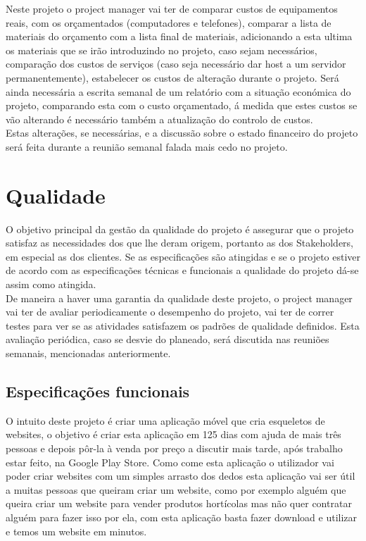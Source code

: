 \documentclass[a4paper]{article}
\begin{document}
Neste projeto o project manager vai ter de comparar custos de equipamentos reais, com os orçamentados (computadores e telefones), comparar a lista de materiais do orçamento com a lista final de materiais, adicionando a esta ultima os materiais que se irão introduzindo no projeto, caso sejam necessários, comparação dos custos de serviços (caso seja necessário dar host a um servidor permanentemente), estabelecer os custos de alteração durante o projeto. Será ainda necessária a escrita semanal de um relatório com a situação económica do projeto, comparando esta com o custo orçamentado, á medida que estes custos se vão alterando é necessário também a atualização do controlo de custos.\\
Estas alterações, se necessárias, e a discussão sobre o estado financeiro do projeto será feita durante a reunião semanal falada mais cedo no projeto.

\newpage

\section{Qualidade}

O objetivo principal da gestão da qualidade do projeto é assegurar que o projeto satisfaz as necessidades dos que lhe deram origem, portanto as dos Stakeholders, em especial as dos clientes. Se as especificações são atingidas e se o projeto estiver de acordo com as especificações técnicas e funcionais a qualidade do projeto dá-se assim como atingida. \\
De maneira a haver uma garantia da qualidade deste projeto, o project manager vai ter de avaliar periodicamente o desempenho do projeto, vai ter de correr testes para ver se as atividades satisfazem os padrões de qualidade definidos. Esta avaliação periódica, caso se desvie do planeado, será discutida nas reuniões semanais, mencionadas anteriormente.

\subsection{Especificações funcionais}
O intuito deste projeto é criar uma aplicação móvel que cria esqueletos de websites, o objetivo é criar esta aplicação em 125 dias com ajuda de mais três pessoas e depois pôr-la à venda por preço a discutir mais tarde, após trabalho estar feito, na Google Play Store. Como come esta aplicação o utilizador vai poder criar websites com um simples arrasto dos dedos esta aplicação vai ser útil a muitas pessoas que queiram criar um website, como por exemplo alguém que queira criar um website para vender produtos hortícolas mas não quer contratar alguém para fazer isso por ela, com esta aplicação basta fazer download e utilizar e temos um website em minutos.
\end{document}
